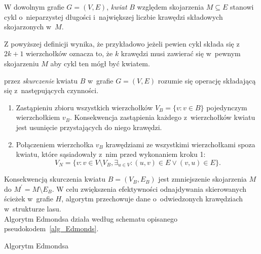 \par{
  \begin{definition}
    W dowolnym grafie $G=(V, E)$, \emph{kwiat} $B$ względem skojarzenia $M \subseteq E$ stanowi cykl o~nieparzystej długości i~największej liczbie krawędzi składowych skojarzonych w~$M$. 
  \end{definition}
  Z powyższej definicji wynika, że przykładowo jeżeli pewien cykl składa się z~$2k + 1$ wierzchołków oznacza to, że $k$ krawędzi musi zawierać się w~pewnym skojarzeniu $M$ aby cykl ten mógł być kwiatem.
  \begin{definition}
    przez \emph{skurczenie} kwiatu $B$ w~grafie $G=(V, E)$ rozumie się operację składającą się z~następujących czynności.
    \begin{enumerate}
       \item Zastąpieniu zbioru wszystkich wierzchołków $V_B=\{v: v \in B\}$ pojedynczym wierzchołkiem $v_B$. Konsekwencja zastąpienia każdego z~wierzchołków kwiatu jest usunięcie przystających do niego krawędzi.
       \item Połączeniem wierzchołka $v_B$ krawędziami ze wszystkimi wierzchołkami spoza kwiatu, które sąsiadowały z~nim przed wykonaniem kroku 1: \[V_N=\{v: v \in V \setminus V_B, \exists_{u \in V}:(u,v)\in E \lor (v, u)\in E\}.\]
     \end{enumerate}
  \end{definition}
  Konsekwencją skurczenia kwiatu $B=(V_B, E_B)$ jest zmniejszenie skojarzenia $M$ do $M^\prime = M \setminus E_B$.
  W celu zwiększenia efektywności odnajdywania skierowanych ścieżek w~grafie $H$, algorytm przechowuje dane o~odwiedzonych krawędziach w~strukturze lasu.\\
  Algorytm Edmondsa działa według schematu opisanego pseudokodem~\ref{alg_Edmonds}.
  \begin{algorithm}
    \caption{Algorytm Edmondsa}\label{alg_Edmonds}
    \begin{algorithmic}[1]




\end{algorithmic}
\end{algorithm}}
